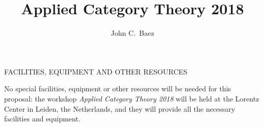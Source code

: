 \documentclass[12pt]{amsart}
\newcommand{\ctr}[1]{\begin{center} #1 \end{center}}
\begin{document}
\ctr{\large FACILITIES, EQUIPMENT AND OTHER RESOURCES}
\title{Applied Category Theory 2018}
\author{John C.\ Baez}

\maketitle

No special facilities, equipment or other resources will be needed for this
proposal: the workshop \textsl{Applied Category Theory 2018} will be held
at the Lorentz Center in Leiden, the Netherlands, and they will provide all
the necessary facilities and equipment.
\end{document}
